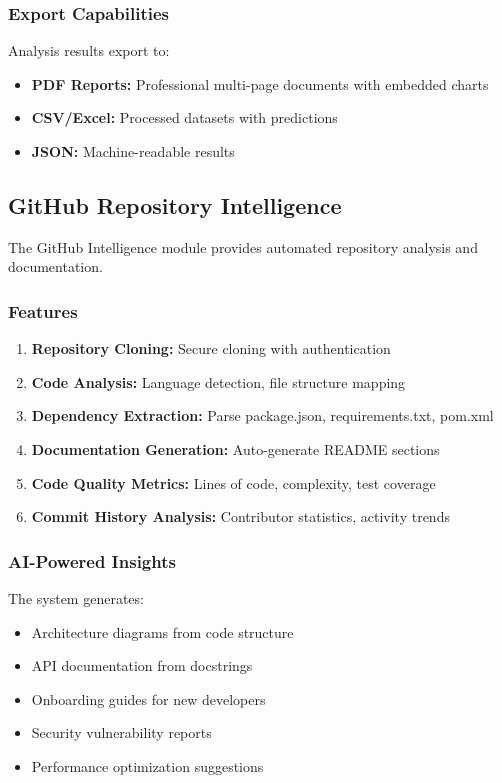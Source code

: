 \documentclass[conference]{IEEEtran}
\begin{document}
\subsubsection{Export Capabilities}

Analysis results export to:
\begin{itemize}
    \item \textbf{PDF Reports:} Professional multi-page documents with embedded charts
    \item \textbf{CSV/Excel:} Processed datasets with predictions
    \item \textbf{JSON:} Machine-readable results
\end{itemize}

\subsection{GitHub Repository Intelligence}

The GitHub Intelligence module provides automated repository analysis and documentation.

\subsubsection{Features}

\begin{enumerate}
    \item \textbf{Repository Cloning:} Secure cloning with authentication
    \item \textbf{Code Analysis:} Language detection, file structure mapping
    \item \textbf{Dependency Extraction:} Parse package.json, requirements.txt, pom.xml
    \item \textbf{Documentation Generation:} Auto-generate README sections
    \item \textbf{Code Quality Metrics:} Lines of code, complexity, test coverage
    \item \textbf{Commit History Analysis:} Contributor statistics, activity trends
\end{enumerate}

\subsubsection{AI-Powered Insights}

The system generates:
\begin{itemize}
    \item Architecture diagrams from code structure
    \item API documentation from docstrings
    \item Onboarding guides for new developers
    \item Security vulnerability reports
    \item Performance optimization suggestions
\end{itemize}
\end{document}
